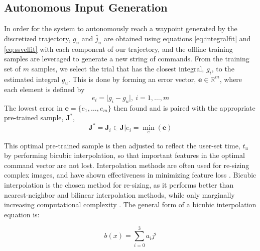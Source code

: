 \documentclass[letterpaper, 10 pt, conference]{ieeeconf}  %
\newcommand\NB[1]{$\spadesuit$\footnote{NB: #1}}
\newcommand{\R}{\mathbb{R}}
\begin{document}
\subsection{Autonomous Input Generation} \label{sec:generate}

In order for the system to autonomously reach a waypoint generated by the discretized trajectory, %
$g_u$ and $\bar{j}_u$ are obtained using equations \eqref{eq:integralfit} and \eqref{eq:ssvelfit} with each component of our trajectory, and the offline training samples are leveraged to generate a new string of commands. From the training set of $m$ samples, we select the trial that has the closest integral, $g_i$, to the estimated integral $g_u$. This is done by forming an error vector, $\bm{e}\in\R^{m}$, where each element is defined by
\begin{equation}
 e_i = \vert g_i-g_u \vert , ~i= 1,\ldots,m
\end{equation}
 The lowest error in $\bm{e} = \{e_1,\ldots,e_m\}$ then found and is paired with the appropriate pre-trained sample, $\bm{J}^*$, %
\begin{equation}
\bm{J}^* = \bm{J}_i \in \bm{J}\vert e_i = \min_e(\bm{e})
\end{equation}

This optimal pre-trained sample is then adjusted to reflect the user-set time, $t_u$ by performing bicubic interpolation, so that important features in the optimal command vector are not lost. Interpolation methods are often used for re-sizing complex images, and have shown effectiveness in minimizing feature loss \cite{bicfeatures}. Bicubic interpolation is the chosen method for re-sizing, as it performs better than nearest-neighbor and bilinear interpolation methods, while only marginally increasing computational complexity \cite{biccomp}. The general form of a bicubic interpolation equation is: 

\begin{equation} \label{eq:bicinter}
    b(x) = \sum_{i=0}^3a_ij^i
\end{equation}
\end{document}
